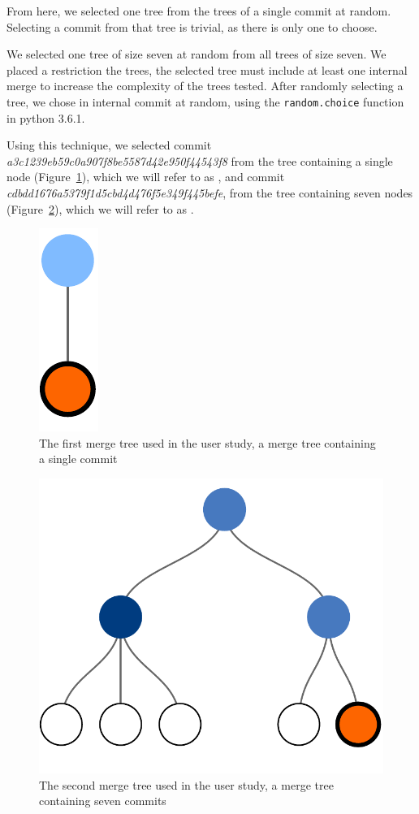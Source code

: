 \documentclass[draft]{IEEEtran}
\begin{document}
From here, we selected one tree from the trees of a single commit at
random. Selecting a commit from that tree is trivial, as there is only
one to choose.

We selected one tree of size seven at random from all trees of size
seven. We placed a restriction the trees, the selected tree must include
at least one internal merge to increase the complexity of the trees
tested. After randomly selecting a tree, we chose in internal commit at
random, using the \verb|random.choice| function in python 3.6.1.

Using this technique, we selected commit
\emph{a3c1239eb59c0a907f8be5587d42e950f44543f8} from the tree containing
a single node (Figure~\ref{fig:commit_1}), which we will refer to as
\comA, and commit \emph{cdbdd1676a5379f1d5cbd4d476f5e349f445befe}, from
the tree containing seven nodes (Figure~\ref{fig:commit_2}), which we
will refer to as \comB.

\begin{figure}[bpt]
  \centering
  \includegraphics[width=0.08\linewidth]{figures/commits/1-commit.pdf}
  \caption{The first merge tree used in the user study, a merge tree
    containing a single commit}
  \label{fig:commit_1}
\end{figure}

\begin{figure}[bpt]
  \centering
  \includegraphics[width=0.5\linewidth]{figures/commits/7-commits.pdf}
  \caption{The second merge tree used in the user study, a merge tree
    containing seven commits}
  \label{fig:commit_2}
\end{figure}
\end{document}

